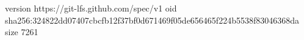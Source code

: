 version https://git-lfs.github.com/spec/v1
oid sha256:324822dd07407cbcfb12f37bf0d671469f05de656465f224b5538f83046368da
size 7261
